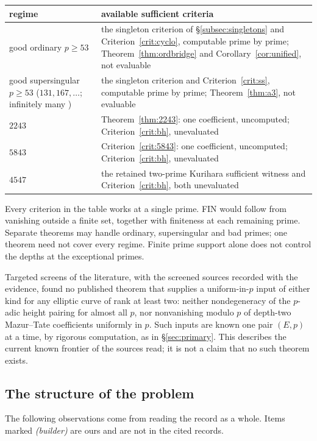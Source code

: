 \begin{center}
\begin{tabular}{@{}p{}p{}@{}}
\toprule
regime & available sufficient criteria\\ \midrule
good ordinary $p\ge53$ & the singleton criterion of \S\ref{subsec:singletons} and Criterion~\ref{crit:cyclo}, computable prime by prime; Theorem~\ref{thm:ordbridge} and Corollary~\ref{cor:unified}, not evaluable\\
good supersingular $p\ge53$ ($131,167,\dots$; infinitely many \cite{elkies}) & the singleton criterion and Criterion~\ref{crit:ss}, computable prime by prime; Theorem~\ref{thm:a3}, not evaluable\\
$2243$ & Theorem~\ref{thm:2243}: one coefficient, uncomputed; Criterion~\ref{crit:bh}, unevaluated\\
$5843$ & Criterion~\ref{crit:5843}: one coefficient, uncomputed; Criterion~\ref{crit:bh}, unevaluated\\
$4547$ & the retained two-prime Kurihara sufficient witness and Criterion~\ref{crit:bh}, both unevaluated\\ \bottomrule
\end{tabular}
\end{center}
Every criterion in the table works at a single prime. FIN would follow from vanishing outside a finite set, together with finiteness at each remaining prime. Separate theorems may handle ordinary, supersingular and bad primes; one theorem need not cover every regime. Finite prime support alone does not control the depths at the exceptional primes.

Targeted screens of the literature, with the screened sources recorded with the evidence, found no published theorem that supplies a uniform-in-$p$ input of either kind for any elliptic curve of rank at least two: neither nondegeneracy of the $p$-adic height pairing for almost all $p$, nor nonvanishing modulo $p$ of depth-two Mazur--Tate coefficients uniformly in $p$. Such inputs are known one pair $(E,p)$ at a time, by rigorous computation, as in \S\ref{sec:primary}. This describes the current known frontier of the sources read; it is not a claim that no such theorem exists.

\subsection{The structure of the problem}
The following observations come from reading the record as a whole. Items marked \emph{(builder)} are ours and are not in the cited records.

